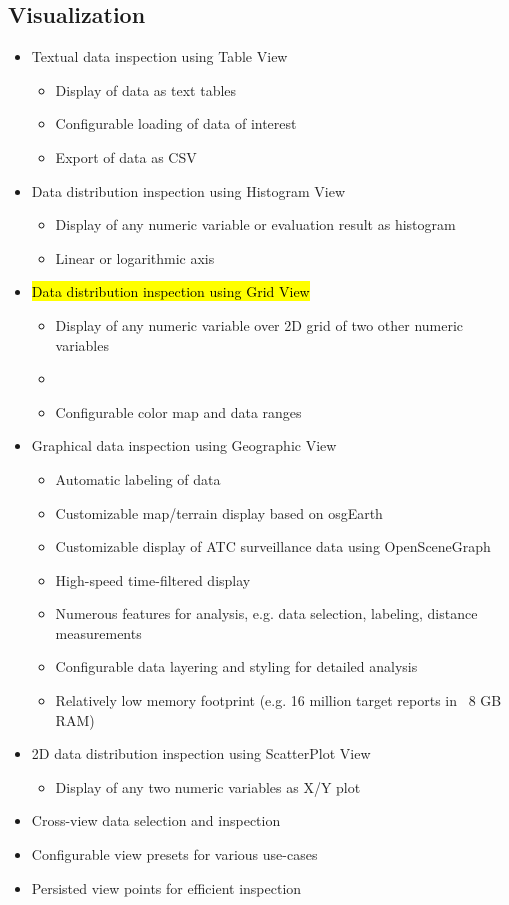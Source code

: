 \subsection{Visualization}
\begin{itemize}  
    \item Textual data inspection using Table View
    \begin{itemize}  
        \item Display of data as text tables
        \item Configurable loading of data of interest
        \item Export of data as CSV
    \end{itemize}
    \item Data distribution inspection using Histogram View
    \begin{itemize}  
        \item Display of any numeric variable or evaluation result as histogram
        \item Linear or logarithmic axis
    \end{itemize}
        \item \hl{Data distribution inspection using Grid View}
    \begin{itemize}  
        \item Display of any numeric variable over 2D grid of two other numeric variables
        \item 
        \item Configurable color map and data ranges
    \end{itemize}
    \item Graphical data inspection using Geographic View
    \begin{itemize}  
        \item Automatic labeling of data
        \item Customizable map/terrain display based on osgEarth
        \item Customizable display of ATC surveillance data using OpenSceneGraph
        \item High-speed time-filtered display
        \item Numerous features for analysis, e.g. data selection, labeling, distance measurements
        \item Configurable data layering and styling for detailed analysis
        \item Relatively low memory footprint (e.g. 16 million target reports in ~8 GB RAM)
    \end{itemize}    
    \item 2D data distribution inspection using ScatterPlot View
    \begin{itemize}  
        \item Display of any two numeric variables as X/Y plot
    \end{itemize}
    \item Cross-view data selection and inspection
    \item Configurable view presets for various use-cases
    \item Persisted view points for efficient inspection
\end{itemize}

